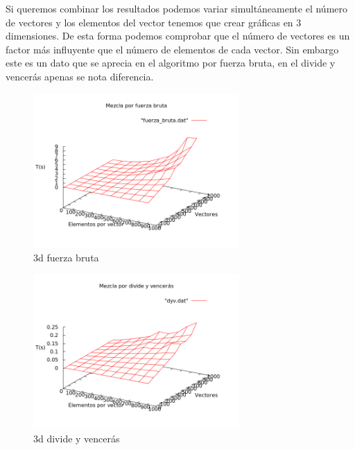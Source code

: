 \begin{frame}
	\begin{block}
	
	Si queremos combinar los resultados podemos variar simult\'aneamente el n\'umero de 			vectores y los elementos del vector tenemos que crear gr\'aficas en $3$ dimensiones.
	De esta forma podemos comprobar que el n\'umero de vectores es un factor m\'as 				influyente que el n\'umero de elementos de cada vector. Sin embargo este es un dato 			que se aprecia en el algoritmo por fuerza bruta, en el divide y vencer\'as apenas se 			nota diferencia.
	\end{block}
\end{frame}

\begin{frame}
	\begin{block}
	
	\begin{figure}[htb] 
	\centering
	\includegraphics[width=0.7\textwidth]{../Obligatorio/Graficas/3d_fuerza_bruta.png}
	\caption{3d fuerza bruta} 
	\label{fig:3d_f} 
\end{figure}
	\end{block}
\end{frame}

\begin{frame}
	\begin{block}
	
	\begin{figure}[htb] 
	\centering
	\includegraphics[width=0.7\textwidth]{../Obligatorio/Graficas/3d_dyv.png}
	\caption{3d divide y vencerás} 
	\label{fig:3d_d} 
\end{figure}
	\end{block}
\end{frame}	
